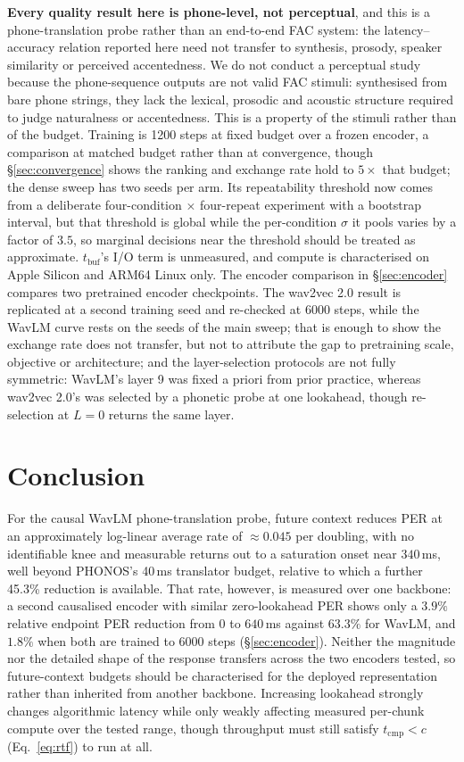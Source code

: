 \documentclass[journal]{IEEEtran}
\newcommand{\tcmp}{\ensuremath{t_{\mathrm{cmp}}}}
\newcommand{\tbuf}{\ensuremath{t_{\mathrm{buf}}}}
\begin{document}
\textbf{Every quality result here is phone-level, not perceptual}, and this is
a phone-translation probe rather than an end-to-end FAC system: the
latency--accuracy relation reported here need not transfer to synthesis,
prosody, speaker similarity or perceived accentedness. We do not conduct a perceptual
study because the phone-sequence outputs are not valid FAC stimuli: synthesised
from bare phone strings, they lack the lexical, prosodic and acoustic structure
required to judge naturalness or accentedness. This is a property of the
stimuli rather than of the budget. Training is 1200 steps at fixed budget
over a frozen encoder, a comparison at matched budget rather than at
convergence, though \S\ref{sec:convergence} shows the ranking and exchange
rate hold to $5\times$ that budget; the dense sweep has two
seeds per arm. Its repeatability threshold now comes from a deliberate
four-condition $\times$ four-repeat experiment with a bootstrap interval, but
that threshold is global while the per-condition $\sigma$ it pools varies by a
factor of $3.5$, so marginal decisions near the threshold should be treated as
approximate. \tbuf{}'s I/O term is unmeasured, and compute is characterised on Apple
Silicon and ARM64 Linux only. The encoder comparison in
\S\ref{sec:encoder} compares two pretrained encoder checkpoints. The wav2vec
2.0 result is replicated at a second training seed and re-checked at 6000
steps, while the WavLM curve rests on the seeds of the main sweep; that is
enough to show the exchange rate does not transfer, but not to attribute the
gap to pretraining scale, objective or architecture; and the layer-selection protocols are not
fully symmetric: WavLM's layer 9 was fixed a priori from prior practice,
whereas wav2vec 2.0's was selected by a phonetic probe at one lookahead, though
re-selection at $L{=}0$ returns the same layer.

\section{Conclusion}

For the causal WavLM phone-translation probe, future context reduces PER at an
approximately log-linear average rate of ${\approx}0.045$ per doubling, with no
identifiable knee and measurable returns out to a saturation onset near
$340$\,ms, well beyond PHONOS's 40\,ms translator budget, relative
to which a further 45.3\% reduction is available. That rate, however, is measured
over one backbone: a second causalised encoder with similar zero-lookahead PER
shows only a $3.9\%$ relative endpoint PER reduction from $0$ to $640$\,ms
against $63.3\%$ for WavLM, and $1.8\%$ when both are trained to 6000 steps
(\S\ref{sec:encoder}). Neither the magnitude nor the detailed shape of the
response transfers across the two encoders tested, so future-context budgets
should be characterised for the deployed representation rather than inherited
from another backbone. Increasing lookahead strongly changes algorithmic latency
while only weakly affecting measured per-chunk compute over the tested range,
though throughput must still satisfy $\tcmp<c$
(Eq.~\ref{eq:rtf}) to run at all.
\end{document}
